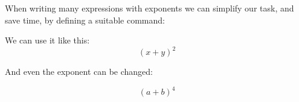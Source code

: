 \documentclass{article}
\begin{document}
When writing many expressions with exponents we can simplify our task, and save time, by defining a suitable command:

\newcommand{\plusbinomial}[3][2]{\ensuremath{(#2 + #3)^#1}}

We can use it like this: \[ \plusbinomial{x}{y} \]

And even the exponent can be changed:

\[ \plusbinomial[4]{a}{b} \]
\end{document}
